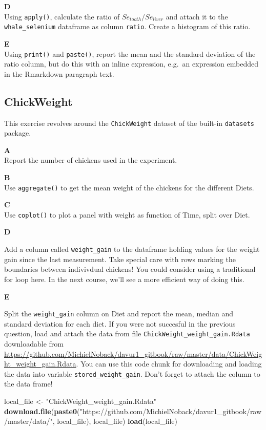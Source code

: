 \documentclass[]{book}
\newenvironment{Shaded}{\begin{snugshade}}{\end{snugshade}}
\newcommand{\KeywordTok}[1]{\textcolor[rgb]{0.13,0.29,0.53}{\textbf{#1}}}
\newcommand{\NormalTok}[1]{#1}
\newcommand{\StringTok}[1]{\textcolor[rgb]{0.31,0.60,0.02}{#1}}
\begin{document}
\textbf{D}\\
Using \texttt{apply()}, calculate the ratio of \(Se_{tooth} / Se_{liver}\) and attach it to the \texttt{whale\_selenium} dataframe as column \texttt{ratio}. Create a histogram of this ratio.

\textbf{E}\\
Using \texttt{print()} and \texttt{paste()}, report the mean and the standard deviation of the ratio column, but do this with an inline expression, e.g.~an expression embedded in the Rmarkdown paragraph text.

\hypertarget{chickweight}{%
\subsection{ChickWeight}\label{chickweight}}

This exercise revolves around the \texttt{ChickWeight} dataset of the built-in \texttt{datasets} package.

\textbf{A}\\
Report the number of chickens used in the experiment.

\textbf{B}\\
Use \texttt{aggregate()} to get the mean weight of the chickens for the different Diets.

\textbf{C}\\
Use \texttt{coplot()} to plot a panel with weight as function of Time, split over Diet.

\textbf{D}

Add a column called \texttt{weight\_gain} to the dataframe holding values for the weight gain since the last measurement. Take special care with rows marking the boundaries between indivivdual chickens! You could consider using a traditional for loop here.
In the next course, we'll see a more efficient way of doing this.

\textbf{E}

Split the \texttt{weight\_gain} column on Diet and report the mean, median and standard deviation for each diet.
If you were not succesful in the previous question, load and attach the data from file \texttt{ChickWeight\_weight\_gain.Rdata} downloadable from \url{https://github.com/MichielNoback/davur1_gitbook/raw/master/data/ChickWeight_weight_gain.Rdata}. You can use this code chunk for downloading and loading the data into variable \texttt{stored\_weight\_gain}. Don't forget to attach the column to the data frame!

\begin{Shaded}
\begin{Highlighting}[]
\NormalTok{local_file <-}\StringTok{ "ChickWeight_weight_gain.Rdata"}
\KeywordTok{download.file}\NormalTok{(}\KeywordTok{paste0}\NormalTok{(}\StringTok{"https://github.com/MichielNoback/davur1_gitbook/raw/master/data/"}\NormalTok{, local_file), local_file)}
\KeywordTok{load}\NormalTok{(local_file)}
\end{Highlighting}
\end{Shaded}
\end{document}
